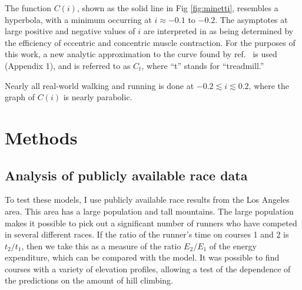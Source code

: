 \documentclass[10pt,letterpaper]{article}
\begin{document}
The function $C(i)$, shown as the solid line in Fig \ref{fig:minetti}, resembles a hyperbola, with a
minimum occurring at $i\approx -0.1$ to $-0.2$. 
The asymptotes
at large positive and negative values of $i$ are interpreted in \cite{minetti} as being determined by the
efficiency of eccentric and concentric muscle contraction. For the purposes of this work, a new analytic
approximation to the curve found by ref.~\cite{minetti} is used (Appendix 1), and is referred to as
$C_t$, where ``t'' stands for ``treadmill.''

Nearly all real-world walking and running is
done at $-0.2 \lesssim i \lesssim 0.2$, where the graph of $C(i)$ is nearly parabolic.

\section{Methods}

\subsection{Analysis of publicly available race data}

To test these models, I use publicly available race results from the Los Angeles area.
This area has a large population and tall mountains. The large population makes it possible
to pick out a significant number of runners who have competed in several different races.
If the ratio of the runner's time on courses 1 and 2 is $t_2/t_1$, then we take this
as a measure of the ratio $E_2/E_1$ of the energy expenditure, which can be compared with
the model. It was possible to find courses with a variety of elevation profiles, allowing
a test of the dependence of the predictions on the amount of hill climbing.
\end{document}
